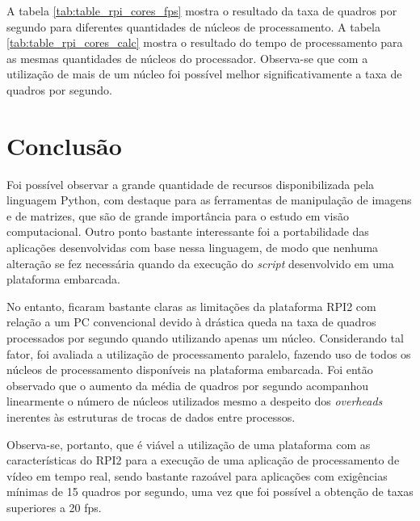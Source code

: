 \documentclass[conference]{IEEEtran}
\begin{document}
A tabela \ref{tab:table_rpi_cores_fps} mostra o resultado da taxa de quadros por segundo para diferentes quantidades de núcleos de processamento. A tabela \ref{tab:table_rpi_cores_calc} mostra o resultado do tempo de processamento para as mesmas quantidades de núcleos do processador. Observa-se que com a utilização de mais de um núcleo foi possível melhor significativamente a taxa de quadros por segundo.


\section{Conclusão}
Foi possível observar a grande quantidade de recursos disponibilizada pela linguagem Python, com destaque para as ferramentas de manipulação de imagens e de matrizes, que são de grande importância para o estudo em visão computacional. Outro ponto bastante interessante foi a portabilidade das aplicações desenvolvidas com base nessa linguagem, de modo que nenhuma alteração se fez necessária quando da execução do \textit{script} desenvolvido em uma plataforma embarcada.

No entanto, ficaram bastante claras as limitações da plataforma RPI2 com relação a um PC convencional devido à drástica queda na taxa de quadros processados por segundo quando utilizando apenas um núcleo. Considerando tal fator, foi avaliada a utilização de processamento paralelo, fazendo uso de todos os núcleos de processamento disponíveis na plataforma embarcada. Foi então observado que o aumento da média de quadros por segundo acompanhou linearmente o número de núcleos utilizados mesmo a despeito dos \textit{overheads} inerentes às estruturas de trocas de dados entre processos.

Observa-se, portanto, que é viável a utilização de uma plataforma com as características do RPI2 para a execução de uma aplicação de processamento de vídeo em tempo real, sendo bastante razoável para aplicações com exigências mínimas de 15 quadros por segundo, uma vez que foi possível a obtenção de taxas superiores a 20 fps. 











\end{document}
